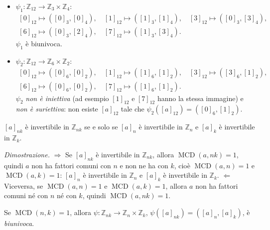 \documentclass[11pt,a4paper]{article}
\begin{document}
\begin{esempio}
\begin{itemize}
  \item $\psi_1 : \mathbb{Z}_{12} \to \mathbb{Z}_3 \times \mathbb{Z}_4$:
  \[
    \begin{gathered}
    [0]_{12} \mapsto ([0]_3, [0]_4), \quad [1]_{12} \mapsto ([1]_3, [1]_4), \quad [3]_{12} \mapsto ([0]_3, [3]_4),\\
    [6]_{12} \mapsto ([0]_3, [2]_4), \quad [7]_{12} \mapsto ([1]_3, [3]_4).
    \end{gathered}
  \]
  $\psi_1$ è biunivoca.
  \item $\psi_2 : \mathbb{Z}_{12} \to \mathbb{Z}_6 \times \mathbb{Z}_2$:
  \[
    \begin{gathered}
    [0]_{12} \mapsto ([0]_6, [0]_2), \quad [1]_{12} \mapsto ([1]_6, [1]_2), \quad [3]_{12} \mapsto ([3]_6, [1]_2),\\
    [6]_{12} \mapsto ([0]_6, [0]_2), \quad [7]_{12} \mapsto ([1]_6, [1]_2).
    \end{gathered}
  \]
  $\psi_2$ \emph{non è iniettiva} (ad esempio $[1]_{12}$ e $[7]_{12}$ hanno la stessa immagine) e \emph{non è suriettiva}: non esiste $[a]_{12}$ tale che $\psi_2([a]_{12}) = ([0]_6, [1]_2)$.
\end{itemize}
\end{esempio}

\begin{osservazione}
$[a]_{nk}$ è invertibile in $\mathbb{Z}_{nk}$ se e solo se $[a]_n$ è invertibile in $\mathbb{Z}_n$ e $[a]_k$ è invertibile in $\mathbb{Z}_k$.

\emph{Dimostrazione.} $\Rightarrow$ Se $[a]_{nk}$ è invertibile in $\mathbb{Z}_{nk}$, allora $\operatorname{MCD}(a, nk) = 1$, quindi $a$ non ha fattori comuni con $n$ e non ne ha con $k$, cioè $\operatorname{MCD}(a, n) = 1$ e $\operatorname{MCD}(a, k) = 1$: $[a]_n$ è invertibile in $\mathbb{Z}_n$ e $[a]_k$ è invertibile in $\mathbb{Z}_k$. $\Leftarrow$ Viceversa, se $\operatorname{MCD}(a, n) = 1$ e $\operatorname{MCD}(a, k) = 1$, allora $a$ non ha fattori comuni né con $n$ né con $k$, quindi $\operatorname{MCD}(a, nk) = 1$.
\end{osservazione}

\begin{proposizione}
Se $\operatorname{MCD}(n, k) = 1$, allora $\psi : \mathbb{Z}_{nk} \to \mathbb{Z}_n \times \mathbb{Z}_k$, $\psi([a]_{nk}) = ([a]_n, [a]_k)$, è \emph{biunivoca}.
\end{proposizione}
\end{document}
